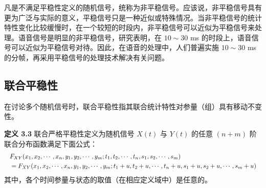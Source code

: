 \documentclass[11pt,openany,UTF8]{ctexbook}
\newcommand{\thm}[1]{\par\medskip\noindent\textbf{#1}\quad}
\begin{document}
凡是不满足平稳性定义的随机信号\nobreak，统称为非平稳信号\nobreak。应该说\nobreak，非平稳信号具有更为广泛与实际的意义\nobreak，平稳信号只是一种近似或特殊情况\nobreak。当非平稳信号的统计特性变化比较缓慢时\nobreak，在一个较短的时段内\nobreak，非平稳信号可以近似为平稳信号来处理\nobreak。语音信号是明显的非平稳信号\nobreak，研究表明\nobreak，在 $10\sim30$ ms 的时段上\nobreak，语音信号可以近似为平稳信号对待\nobreak。因此\nobreak，在语音的处理中\nobreak，人们普遍实施 $10\sim30$ ms 的分帧\nobreak，再采用平稳信号的处理技术解决有关问题\nobreak。

\subsection{联合平稳性}
在讨论多个随机信号时\nobreak，联合平稳性指其联合统计特性对参量（组\nobreak）具有移动不变性\nobreak。



\thm{定义 3.3} 联合严格平稳性定义为随机信号 $X(t)$ 与 $Y(t)$ 的任意 $(n+m)$ 阶联合分布函数满足下面公式\nobreak：
\[
\resizebox{\linewidth}{!}{$\displaystyle
\begin{aligned}
&F_{XY}(x_1,x_2,\cdots,x_n,y_1,y_2,\cdots,y_m;t_1,t_2,\cdots,t_n,s_1,s_2,\cdots,s_m)\\
&=F_{XY}(x_1,x_2,\cdots,x_n,y_1,y_2,\cdots,y_m;t_1+u,t_2+u,\cdots,t_n+u,s_1+u,s_2+u,\cdots,s_m+u)
\end{aligned}$}
\]
其中\nobreak，各个时间参量与状态的取值（在相应定义域中\nobreak）是任意的\nobreak。
\end{document}
